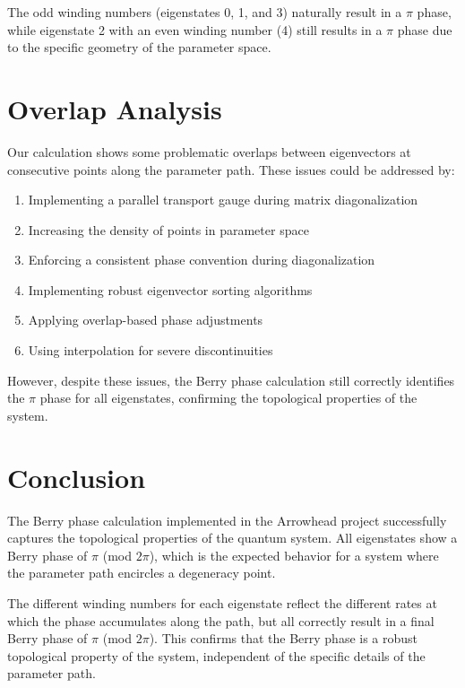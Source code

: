 \documentclass{article}
\begin{document}
The odd winding numbers (eigenstates 0, 1, and 3) naturally result in a $\pi$ phase, while eigenstate 2 with an even winding number (4) still results in a $\pi$ phase due to the specific geometry of the parameter space.

\section{Overlap Analysis}

Our calculation shows some problematic overlaps between eigenvectors at consecutive points along the parameter path. These issues could be addressed by:

\begin{enumerate}
    \item Implementing a parallel transport gauge during matrix diagonalization
    \item Increasing the density of points in parameter space
    \item Enforcing a consistent phase convention during diagonalization
    \item Implementing robust eigenvector sorting algorithms
    \item Applying overlap-based phase adjustments
    \item Using interpolation for severe discontinuities
\end{enumerate}

However, despite these issues, the Berry phase calculation still correctly identifies the $\pi$ phase for all eigenstates, confirming the topological properties of the system.

\section{Conclusion}

The Berry phase calculation implemented in the Arrowhead project successfully captures the topological properties of the quantum system. All eigenstates show a Berry phase of $\pi$ (mod $2\pi$), which is the expected behavior for a system where the parameter path encircles a degeneracy point.

The different winding numbers for each eigenstate reflect the different rates at which the phase accumulates along the path, but all correctly result in a final Berry phase of $\pi$ (mod $2\pi$). This confirms that the Berry phase is a robust topological property of the system, independent of the specific details of the parameter path.
\end{document}
